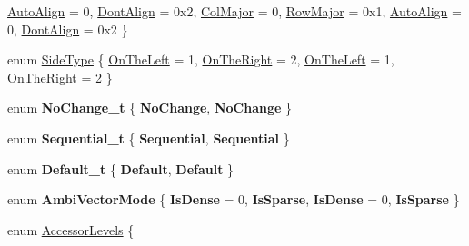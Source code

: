 \begin{DoxyCompactItemize}
\hyperlink{group__enums_ggaacded1a18ae58b0f554751f6cdf9eb13a28d63c0dd8560827162decfd898804f4}{Auto\+Align} = 0, 
\hyperlink{group__enums_ggaacded1a18ae58b0f554751f6cdf9eb13a40a452614141522dd313363dbbd65726}{Dont\+Align} = 0x2, 
\newline
\hyperlink{group__enums_ggaacded1a18ae58b0f554751f6cdf9eb13a0cbd4bdd0abcfc0224c5fcb5e4f6669a}{Col\+Major} = 0, 
\hyperlink{group__enums_ggaacded1a18ae58b0f554751f6cdf9eb13acfcde9cd8677c5f7caf6bd603666aae3}{Row\+Major} = 0x1, 
\hyperlink{group__enums_ggaacded1a18ae58b0f554751f6cdf9eb13a28d63c0dd8560827162decfd898804f4}{Auto\+Align} = 0, 
\hyperlink{group__enums_ggaacded1a18ae58b0f554751f6cdf9eb13a40a452614141522dd313363dbbd65726}{Dont\+Align} = 0x2
 \}
\item 
enum \hyperlink{group__enums_gac22de43beeac7a78b384f99bed5cee0b}{Side\+Type} \{ \hyperlink{group__enums_ggac22de43beeac7a78b384f99bed5cee0ba129609b3bdf23b071f5f86cf2f995ec4}{On\+The\+Left} = 1, 
\hyperlink{group__enums_ggac22de43beeac7a78b384f99bed5cee0ba99dc75d8e00b6c3a5bdc31940f47492b}{On\+The\+Right} = 2, 
\hyperlink{group__enums_ggac22de43beeac7a78b384f99bed5cee0ba129609b3bdf23b071f5f86cf2f995ec4}{On\+The\+Left} = 1, 
\hyperlink{group__enums_ggac22de43beeac7a78b384f99bed5cee0ba99dc75d8e00b6c3a5bdc31940f47492b}{On\+The\+Right} = 2
 \}
\item 
\mbox{\label{namespace_eigen_a57fe75444f853cd2dd2b6b94e27dcac7}} 
enum {\bfseries No\+Change\+\_\+t} \{ {\bfseries No\+Change}, 
{\bfseries No\+Change}
 \}
\item 
\mbox{\label{namespace_eigen_ac44c6508f8e204a03efbfd555a63a21f}} 
enum {\bfseries Sequential\+\_\+t} \{ {\bfseries Sequential}, 
{\bfseries Sequential}
 \}
\item 
\mbox{\label{namespace_eigen_a644c9489710c76e32bd3a9b15d83ca43}} 
enum {\bfseries Default\+\_\+t} \{ {\bfseries Default}, 
{\bfseries Default}
 \}
\item 
\mbox{\label{namespace_eigen_a59b71c21bbdd3b0bb8a7a1dffd92e1bf}} 
enum {\bfseries Ambi\+Vector\+Mode} \{ {\bfseries Is\+Dense} = 0, 
{\bfseries Is\+Sparse}, 
{\bfseries Is\+Dense} = 0, 
{\bfseries Is\+Sparse}
 \}
\item 
enum \hyperlink{group__enums_ga9f93eac38eb83deb0e8dbd42ddf11d5d}{Accessor\+Levels} \{ \newline

\end{DoxyCompactItemize}

